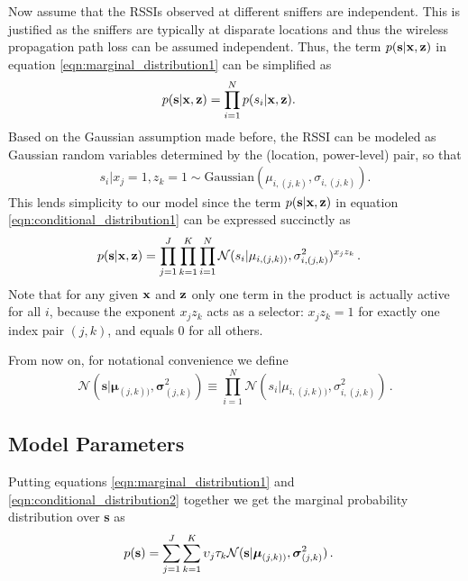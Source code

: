
Now assume that the RSSIs observed at different sniffers are independent. This is justified as the sniffers are typically at disparate locations and thus the wireless propagation path loss can be assumed independent. 
Thus, the term $p( {\bf s} | {\bf x}, {\bf z})$ in equation
\ref{eqn:marginal_distribution1} can be simplified as
\begin{align}
p( {\bf s} | {\bf x}, {\bf z}) & = \prod_{i=1}^N p({s_{i}} | {\bf x}, {\bf
		z}). \label{eqn:conditional_distribution1}
\end{align}
Based on the Gaussian assumption made before, the RSSI can be modeled 
as Gaussian random variables determined by the (location, power-level) pair, so that
\begin{align}
s_{i} | {x_{j}=1}, {z_{k}=1}  \sim  \text{Gaussian}(\mu_{i, (j,k)}, \sigma_{i, (j,k)}).
\end{align}
This lends simplicity to our model since the term $p( {\bf s} | {\bf x}, {\bf z})$ in equation
\ref{eqn:conditional_distribution1} can be expressed succinctly as 
\begin{align}
p( {\bf s} | {\bf x}, {\bf z}) & =  \prod_{j=1}^J \prod_{k=1}^K 
		\prod_{i=1}^N \mathcal{N}(s_{i} |  \mu_{i, (j,k))},\sigma_{i, (j,k)}^2)^{x_j z_k} \, . \label{eqn:conditional_distribution2}
\end{align}
Note that for any given ${\bf x}$ and ${\bf z}$ only one term in the product is actually active for all $i$, because the exponent $x_j z_k$ acts as a selector: $x_j z_k = 1$ for exactly one index pair $(j,k)$, and equals $0$ for all others.

From now on, for notational convenience we define
\[
\mathcal{N}(\mathbf{s} |  \boldsymbol\mu_{(j,k))},\boldsymbol\sigma_{(j,k)}^2) \equiv \prod_{i=1}^N \mathcal{N}(s_{i} |  \mu_{i, (j,k))},\sigma_{i, (j,k)}^2) \, . 
\]

\subsection{Model Parameters}
\label{subsec:modelparameters}

Putting equations \ref{eqn:marginal_distribution1} and
\ref{eqn:conditional_distribution2} together we get the marginal probability distribution over
{\bf s} as
\begin{align}
p( {\bf s}) &= \sum_{j=1}^J \sum_{k=1}^K \upsilon_{j} \tau_{k} \mathcal{N}(\mathbf{s} |  \boldsymbol\mu_{(j,k))},\boldsymbol\sigma_{(j,k)}^2) \, .
\end{align}

